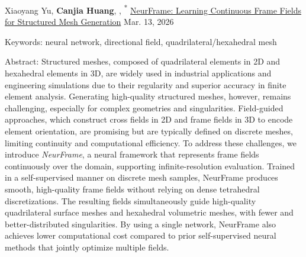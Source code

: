 \begin{cventries}
\cventry
    {Xiaoyang Yu, \textbf{Canjia Huang}, \ZhongguiChen, \JuanCao\textsuperscript{*}}
    {\href{https://arxiv.org/abs/2603.12820}{NeurFrame: Learning Continuous Frame Fields for Structured Mesh Generation}}
    {\arXiv}
    {Mar. 13, 2026}
    {
        \begin{cvitems}
          \item Keywords: neural network, directional field, quadrilateral/hexahedral mesh
          \item \setlength{\acvfigindent}{\leftmargin}%
          \setlength{\acvfigfirstindent}{\leftmargin}%
          Abstract: Structured meshes, composed of quadrilateral elements in 2D and hexahedral elements in 3D, are widely used in industrial applications and engineering simulations due to their regularity and superior accuracy in finite element analysis. Generating high-quality structured meshes, however, remains challenging, especially for complex geometries and singularities. Field-guided approaches, which construct cross fields in 2D and frame fields in 3D to encode element orientation, are promising but are typically defined on discrete meshes, limiting continuity and computational efficiency. To address these challenges, we introduce \emph{NeurFrame}, a neural framework that represents frame fields continuously over the domain, supporting infinite-resolution evaluation. Trained in a self-supervised manner on discrete mesh samples, NeurFrame produces smooth, high-quality frame fields without relying on dense tetrahedral discretizations. The resulting fields simultaneously guide high-quality quadrilateral surface meshes and hexahedral volumetric meshes, with fewer and better-distributed singularities. By using a single network, NeurFrame also achieves lower computational cost compared to prior self-supervised neural methods that jointly optimize multiple fields.\cvpar
          \end{cvitems}
    }

\end{cventries}
